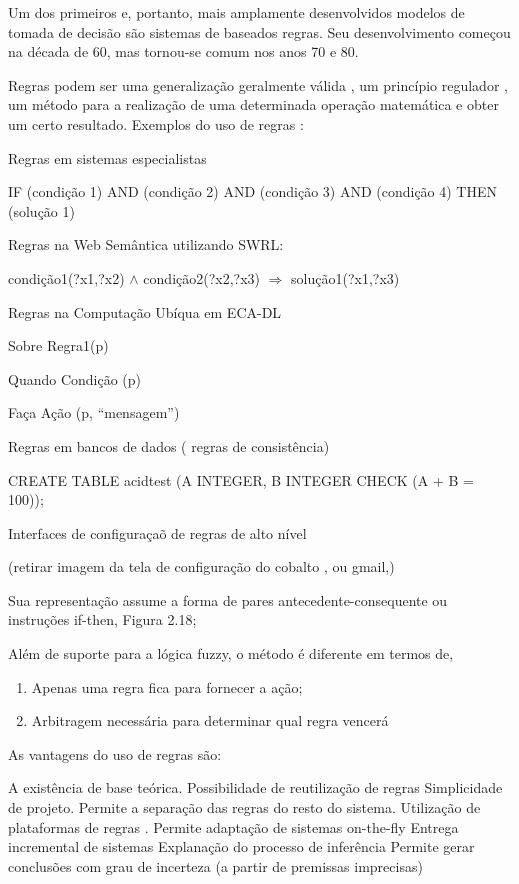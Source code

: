 \documentclass[12pt,a4paper,compsoc]{IEEEtran}
\begin{document}
Um dos primeiros e, portanto, mais amplamente desenvolvidos modelos de tomada de decisão são sistemas de baseados regras. Seu  desenvolvimento começou na década de 60, mas tornou-se comum nos anos 70 e 80.

Regras podem ser  uma generalização geralmente válida , um princípio regulador , um método para a realização de uma determinada  operação matemática e obter um certo resultado. Exemplos do uso de regras  :

Regras em sistemas especialistas

IF (condição 1) AND (condição 2) AND (condição 3) AND (condição 4) THEN (solução 1)


Regras na Web Semântica utilizando SWRL:

condição1(?x1,?x2) $\wedge$ condição2(?x2,?x3) $\Rightarrow$ solução1(?x1,?x3)

Regras na Computação Ubíqua  em  ECA-DL


Sobre  Regra1(p)

Quando Condição (p)

Faça Ação  (p, “mensagem”)


Regras em bancos de dados ( regras  de consistência)

CREATE TABLE acidtest (A INTEGER, B INTEGER CHECK (A + B = 100));


Interfaces de configuraçaõ de regras de alto nível

(retirar imagem da tela de configuração do cobalto , ou gmail,) 


Sua representação assume a forma de pares antecedente-consequente ou instruções if-then, Figura 2.18;



Além de suporte para a lógica fuzzy, o método é diferente em termos de,

\begin{enumerate}
\item Apenas uma regra fica para fornecer a ação;
\item Arbitragem necessária para determinar qual regra vencerá
\end{enumerate}




As vantagens do uso de regras são:

A existência de base teórica.
Possibilidade de reutilização de regras
Simplicidade de projeto. 
Permite a separação das regras do resto do sistema.
Utilização de plataformas de regras .
Permite adaptação de sistemas on-the-fly
Entrega incremental de sistemas
Explanação do processo de inferência
Permite gerar conclusões com grau de incerteza (a partir de premissas imprecisas)
\end{document}
